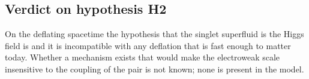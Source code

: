 \subsection{Verdict on hypothesis H2}

On the deflating spacetime the hypothesis that the singlet superfluid is the Higgs field is
 and it is incompatible with any deflation that is fast
enough to matter today. Whether a mechanism exists that would make the electroweak scale insensitive
to the coupling of the pair is not known; none is present in the model.

